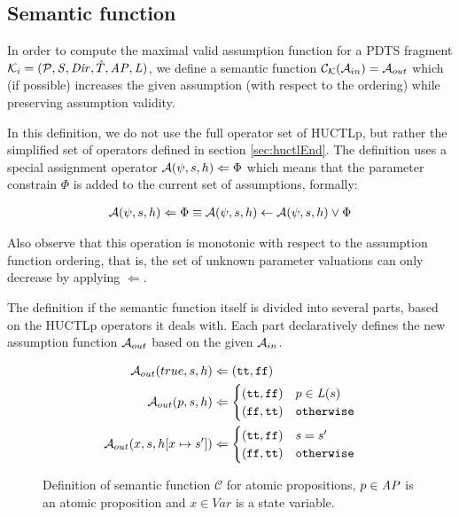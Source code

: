\subsection{Semantic function}

In order to compute the maximal valid assumption function for a \ac{PDTS} fragment $\mathcal{K}_i = (\mathcal{P}, \mathit{S}, \mathit{Dir}, \hat{T}, \mathit{AP}, \mathit{L})$, we define a semantic function $\mathcal{C}_\mathcal{K}(\mathcal{A}_{in}) = \mathcal{A}_{out}$ which (if possible) increases the given assumption (with respect to the ordering) while preserving assumption validity.

In this definition, we do not use the full operator set of \ac{HUCTLp}, but rather the simplified set of operators defined in section \ref{sec:huctlEnd}. The definition uses a special assignment operator $\mathcal{A}(\psi, s, h) \Leftarrow \Phi$ which means that the parameter constrain $\Phi$ is added to the current set of assumptions, formally:

\begin{align*}
	\mathcal{A}(\psi, s, h) \Leftarrow \Phi \equiv \mathcal{A}(\psi, s, h) \gets \mathcal{A}(\psi, s, h) \lor \Phi
\end{align*}

Also observe that this operation is monotonic with respect to the assumption function ordering, that is, the set of unknown parameter valuations can only decrease by applying $\Leftarrow$.

The definition if the semantic function itself is divided into several parts, based on the \ac{HUCTLp} operators it deals with. Each part declaratively defines the new assumption function $\mathcal{A}_{out}$ based on the given $\mathcal{A}_{in}$.

\begin{figure}
	\begin{align*}
	\mathcal{A}_{out}(true, s, h) & \Leftarrow (\texttt{tt}, \texttt{ff}) \\
	\mathcal{A}_{out}(p, s, h) & \Leftarrow 
	\begin{cases}
	(\texttt{tt}, \texttt{ff}) & p \in \mathit{L}(s) \\
	(\texttt{ff}, \texttt{tt}) & \texttt{otherwise} \\
	\end{cases}
	\\
	\mathcal{A}_{out}(x, s, h[ x \mapsto s' ]) & \Leftarrow
	\begin{cases}
	(\texttt{tt}, \texttt{ff}) & s = s' \\
	(\texttt{ff}, \texttt{tt}) & \texttt{otherwise}
	\end{cases}
	\\
	\end{align*}
	
	\caption{Definition of semantic function $\mathcal{C}$ for atomic propositions, $p \in \mathit{AP}$ is an atomic proposition and $x \in Var$ is a state variable.}
	\label{fig:assProp}
\end{figure}

